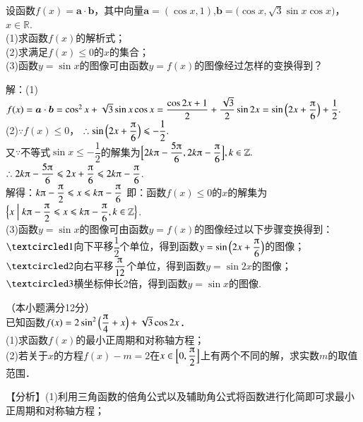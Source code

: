\begin{exercise}
      设函数$f(x)=\bm a\cdot\bm b$，其中向量$\bm a=(\cos x,1)$,$\bm b=\bigl(\cos x,\sqrt3\sin x\cos x\bigr)$，$x\in\mathbb{R}$.\\
      (1)求函数$f(x)$的解析式；\\
      (2)求满足$f(x)\leqslant0$的$x$的集合；\\
      (3)函数$y=\sin x$的图像可由函数$y=f(x)$的图像经过怎样的变换得到？\\
      \begin{answer}
        解：(1)$f(x)=\bm a\cdot\bm b
        =\cos^2x+\sqrt3\sin x\cos x
        =\dfrac{\cos{2x}+1}2+\dfrac{\sqrt3}{2}\sin{2x}
        =\sin{\Bigl(2x+\dfrac{\piup}6\Bigr)}+\dfrac12.$\\
        (2)$\because f(x)\leqslant0$，
        $\therefore \sin{\Bigl(2x+\dfrac{\piup}6\Bigr)}\leqslant-\dfrac12.$\\
        又$\because$不等式$\sin x\leqslant-\dfrac12$的解集为$\Bigl[2k\piup-\dfrac{5\piup}6,2k\piup-\dfrac{\piup}6\Bigr],k\in\mathbb{Z}.$\\
        $\therefore 2k\piup-\dfrac{5\piup}6 \leqslant 2x+\dfrac{\piup}6 \leqslant 2k\piup-\dfrac{\piup}6$.\\
        解得：$k\piup-\dfrac{\piup}2 \leqslant x \leqslant k\piup-\dfrac{\piup}6$
        即：函数$f(x)\leqslant0$的$x$的解集为$\Bigl\{x\Bigm| k\piup-\dfrac{\piup}2 \leqslant x \leqslant k\piup-\dfrac{\piup}6,k\in\mathbb{Z}\Bigr\}$.\\
        (3)函数$y=\sin x$的图像可由函数$y=f(x)$的图像经过以下步骤变换得到：\\
        $\circled{1}$向下平移$\dfrac12$个单位，得到函数$y=\sin{\Bigl(2x+\dfrac{\piup}6\Bigr)}$的图像；\\
        $\circled{2}$向右平移$\dfrac{\piup}{12}$个单位，得到函数$y=\sin {2x}$的图像；\\
        $\circled{3}$横坐标伸长2倍，得到函数$y=\sin x$的图像.
      \end{answer}
    \item
      （本小题满分12分）\\
      已知函数$f(x)=2\sin^2{\Bigl(\dfrac{\piup}4+x\Bigr)}+\sqrt3\cos{2x}$．\\
      (1)求函数$f(x)$的最小正周期和对称轴方程；\\
      (2)若关于$x$的方程$f(x)-m=2$在$x\in\Bigl[0,\dfrac{\piup}2\Bigr]$上有两个不同的解，求实数$m$的取值范围．\\
      \begin{answer}
        【分析】(1)利用三角函数的倍角公式以及辅助角公式将函数进行化简即可求最小正周期和对称轴方程；\\

\end{answer}
\end{exercise}
